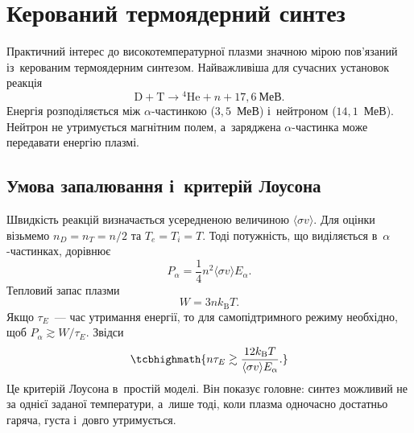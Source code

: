\section{Керований термоядерний синтез}\label{sec:fusion}\hypertarget{fusion}{}

Практичний інтерес до високотемпературної плазми значною мірою пов'язаний із~керованим
термоядерним синтезом. Найважливіша для сучасних установок реакція
\begin{equation*}
	\mathrm D+\mathrm T\rightarrow{}^4\mathrm{He}+n+17{,}6~\mathrm{МеВ}.
\end{equation*}
Енергія розподіляється між $\alpha$-частинкою ($3{,}5$~МеВ) і~нейтроном ($14{,}1$~МеВ).
Нейтрон не утримується магнітним полем, а~заряджена $\alpha$-частинка може передавати
енергію плазмі.



\subsection*{Умова запалювання і~критерій Лоусона}



Швидкість реакцій визначається усередненою величиною $\langle\sigma v\rangle$. Для оцінки
візьмемо $n_D=n_T=n/2$ та $T_e=T_i=T$. Тоді потужність, що виділяється
в~$\alpha$-частинках, дорівнює
\begin{equation*}
	P_\alpha=\frac14n^2\langle\sigma v\rangle E_\alpha.
\end{equation*}
Тепловий запас плазми
\begin{equation*}
	W=3nk_{\mathrm B}T.
\end{equation*}
Якщо $\tau_E$~--- час утримання енергії, то для самопідтримного режиму необхідно, щоб
$P_\alpha\gtrsim W/\tau_E$. Звідси
\begin{equation}\label{eq:lawson}
	\tcbhighmath{n\tau_E\gtrsim\frac{12k_{\mathrm B}T}{\langle\sigma v\rangle E_\alpha}.}
\end{equation}
Це критерій Лоусона в~простій моделі. Він показує головне: синтез можливий не за однієї
заданої температури, а~лише тоді, коли плазма одночасно достатньо гаряча, густа і~довго
утримується.

